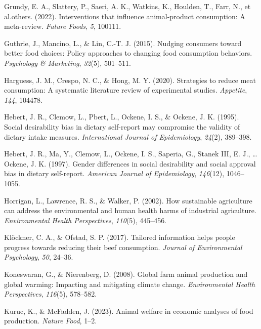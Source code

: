 \documentclass[
  man]{apa6}
\newlength{\cslhangindent}
\newenvironment{CSLReferences}[2] %
 {\begin{list}{}{%
  \setlength{\itemindent}{0pt}
  \setlength{\leftmargin}{0pt}
  \setlength{\parsep}{0pt}
  \ifodd #1
   \setlength{\leftmargin}{\cslhangindent}
   \setlength{\itemindent}{-1\cslhangindent}
  \fi
  \setlength{\itemsep}{#2\baselineskip}}}
 {\end{list}}
\begin{document}
\begin{CSLReferences}{1}{0}
Grundy, E. A., Slattery, P., Saeri, A. K., Watkins, K., Houlden, T., Farr, N., et al.others. (2022). Interventions that influence animal-product consumption: A meta-review. \emph{Future Foods}, \emph{5}, 100111.

Guthrie, J., Mancino, L., \& Lin, C.-T. J. (2015). Nudging consumers toward better food choices: Policy approaches to changing food consumption behaviors. \emph{Psychology \& Marketing}, \emph{32}(5), 501--511.

Harguess, J. M., Crespo, N. C., \& Hong, M. Y. (2020). Strategies to reduce meat consumption: A systematic literature review of experimental studies. \emph{Appetite}, \emph{144}, 104478.

Hebert, J. R., Clemow, L., Pbert, L., Ockene, I. S., \& Ockene, J. K. (1995). Social desirability bias in dietary self-report may compromise the validity of dietary intake measures. \emph{International Journal of Epidemiology}, \emph{24}(2), 389--398.

Hebert, J. R., Ma, Y., Clemow, L., Ockene, I. S., Saperia, G., Stanek III, E. J., \ldots{} Ockene, J. K. (1997). Gender differences in social desirability and social approval bias in dietary self-report. \emph{American Journal of Epidemiology}, \emph{146}(12), 1046--1055.

Horrigan, L., Lawrence, R. S., \& Walker, P. (2002). How sustainable agriculture can address the environmental and human health harms of industrial agriculture. \emph{Environmental Health Perspectives}, \emph{110}(5), 445--456.

Klöckner, C. A., \& Ofstad, S. P. (2017). Tailored information helps people progress towards reducing their beef consumption. \emph{Journal of Environmental Psychology}, \emph{50}, 24--36.

Koneswaran, G., \& Nierenberg, D. (2008). Global farm animal production and global warming: Impacting and mitigating climate change. \emph{Environmental Health Perspectives}, \emph{116}(5), 578--582.

Kuruc, K., \& McFadden, J. (2023). Animal welfare in economic analyses of food production. \emph{Nature Food}, 1--2.


\end{CSLReferences}
\end{document}
